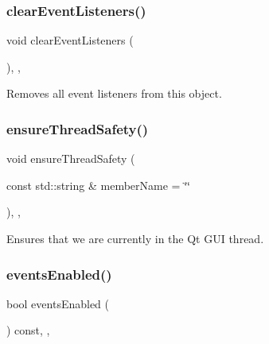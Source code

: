 \subsubsection{\texorpdfstring{clear\+Event\+Listeners()}{clearEventListeners()}}
{\footnotesize\ttfamily void clear\+Event\+Listeners (\begin{DoxyParamCaption}{ }\end{DoxyParamCaption})\hspace{0.3cm}{\ttfamily [protected]}, {\ttfamily [virtual]}, {\ttfamily [inherited]}}



Removes all event listeners from this object. 

\mbox{\label{classsgl_1_1GObservable_a284f31528c0520f8e545c03ac9eeac74}} 
\subsubsection{\texorpdfstring{ensure\+Thread\+Safety()}{ensureThreadSafety()}}
{\footnotesize\ttfamily void ensure\+Thread\+Safety (\begin{DoxyParamCaption}\item[{const std\+::string \&}]{member\+Name = {\ttfamily \char`\"{}\char`\"{}} }\end{DoxyParamCaption})\hspace{0.3cm}{\ttfamily [protected]}, {\ttfamily [virtual]}, {\ttfamily [inherited]}}



Ensures that we are currently in the Qt G\+UI thread. 

\mbox{\label{classsgl_1_1GInteractor_a597a370b592e3737d38d9d2f4e2031ea}} 
\subsubsection{\texorpdfstring{events\+Enabled()}{eventsEnabled()}}
{\footnotesize\ttfamily bool events\+Enabled (\begin{DoxyParamCaption}{ }\end{DoxyParamCaption}) const\hspace{0.3cm}{\ttfamily [override]}, {\ttfamily [virtual]}, {\ttfamily [inherited]}}




